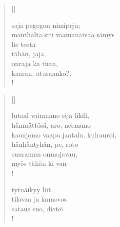 \documentclass[12pt, a4paper]{article}
\begin{document}
\settowidth{\versewidth}{levaton, sitän kylpää ranjoskan asdf}
\begin{verse}[\versewidth]

saja pegogon nimipeja; \\
manthalta siti vaamanatsaa sämys \\
lie teeta \\
tähän, jaja, \\
onraja ka tuan, \\
kaaran, atusaanko?. \\!


\end{verse}
\newpage

\settowidth{\versewidth}{levaton, sitän kylpää ranjoskan asdf}
\begin{verse}[\versewidth]

lutaal vainmano eija likili, \\
hänmättösä, aro, neemuno \\
kaonjomo vaapo jaatalu, kulrauroi, \\
hänhäntyhän, pe, roto \\
suuraman onmojavau, \\
myös tähän ki van \\!



tytnäikyy liit \\
tilavaa ja kamovos \\
sataus suo, dietei \\!


\end{verse}
\newpage
\end{document}
